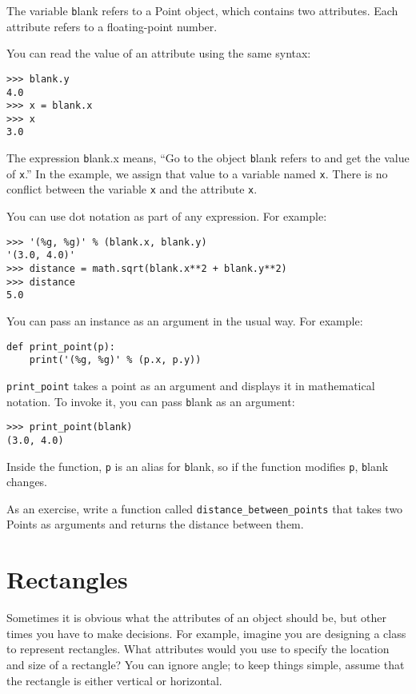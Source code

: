 \documentclass[
DIV=11,
fontsize=12,
twoside,
headinclude=false,
titlepage=firstiscover,
abstract=true,
headsepline=true,
footsepline=true,
chapterprefix=true, %
headings=big,
bibliography=totoc,%
captions=tableheading
]{scrbook}
\theoremstyle{definition}
\begin{document}
The variable {\texttt blank} refers to a Point object, which
contains two attributes.  Each attribute refers to a
floating-point number.

You can read the value of an attribute using the same syntax:

\begin{lstlisting}
>>> blank.y
4.0
>>> x = blank.x
>>> x
3.0
\end{lstlisting}
%
The expression {\texttt blank.x} means, ``Go to the object {\texttt blank}
refers to and get the value of {\texttt x}.''  In the example, we assign that
value to a variable named {\texttt x}.  There is no conflict between
the variable {\texttt x} and the attribute {\texttt x}.

You can use dot notation as part of any expression.  For example:

\begin{lstlisting}
>>> '(%g, %g)' % (blank.x, blank.y)
'(3.0, 4.0)'
>>> distance = math.sqrt(blank.x**2 + blank.y**2)
>>> distance
5.0
\end{lstlisting}
%
You can pass an instance as an argument in the usual way.
For example:

\begin{lstlisting}
def print_point(p):
    print('(%g, %g)' % (p.x, p.y))
\end{lstlisting}
%
\verb"print_point" takes a point as an argument and displays it in
mathematical notation.  To invoke it, you can pass {\texttt blank} as
an argument:

\begin{lstlisting}
>>> print_point(blank)
(3.0, 4.0)
\end{lstlisting}
%
Inside the function, {\texttt p} is an alias for {\texttt blank}, so if
the function modifies {\texttt p}, {\texttt blank} changes.

As an exercise, write a function called \verb"distance_between_points"
that takes two Points as arguments and returns the distance between
them.


\section{Rectangles}
\label{rectangles}

Sometimes it is obvious what the attributes of an object should be,
but other times you have to make decisions.  For example, imagine you
are designing a class to represent rectangles.  What attributes would
you use to specify the location and size of a rectangle?  You can
ignore angle; to keep things simple, assume that the rectangle is
either vertical or horizontal.
\end{document}
